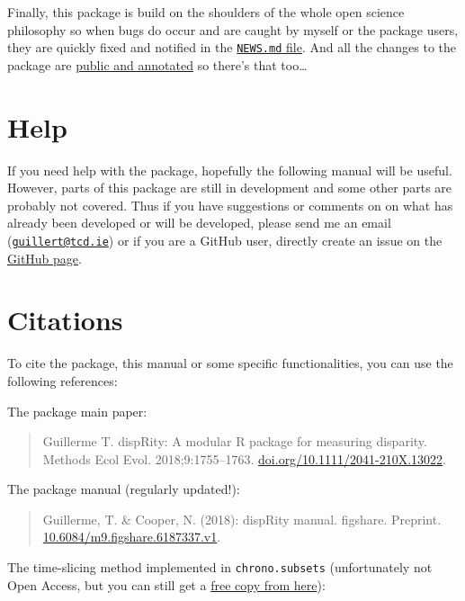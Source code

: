 \documentclass[
]{book}
\begin{document}
Finally, this package is build on the shoulders of the whole open science philosophy so when bugs do occur and are caught by myself or the package users, they are quickly fixed and notified in the \href{https://github.com/TGuillerme/dispRity/blob/master/NEWS.md}{\texttt{NEWS.md} file}. And all the changes to the package are \href{https://github.com/TGuillerme/dispRity/commits/master}{public and annotated} so there's that too\ldots{}

\hypertarget{help}{%
\section{Help}\label{help}}

If you need help with the package, hopefully the following manual will be useful.
However, parts of this package are still in development and some other parts are probably not covered.
Thus if you have suggestions or comments on on what has already been developed or will be developed, please send me an email (\href{mailto:guillert@tcd.ie}{\nolinkurl{guillert@tcd.ie}}) or if you are a GitHub user, directly create an issue on the \href{https://github.com/TGuillerme/dispRity}{GitHub page}.

\hypertarget{citations}{%
\section{Citations}\label{citations}}

To cite the package, this manual or some specific functionalities, you can use the following references:

The package main paper:

\begin{quote}
Guillerme T. dispRity: A modular R package for measuring disparity. Methods Ecol Evol. 2018;9:1755--1763. \href{https://doi.org/10.1111/2041-210X.13022}{doi.org/10.1111/2041-210X.13022}.
\end{quote}

The package manual (regularly updated!):

\begin{quote}
Guillerme, T. \& Cooper, N. (2018): dispRity manual. figshare. Preprint. \href{https://doi.org/10.6084/m9.figshare.6187337.v1}{10.6084/m9.figshare.6187337.v1}.
\end{quote}

The time-slicing method implemented in \texttt{chrono.subsets} (unfortunately not Open Access, but you can still get a \href{https://tguillerme.github.io/papers/Guillerme\&Cooper-2018-Palaeontology.pdf}{free copy from here}):
\end{document}
